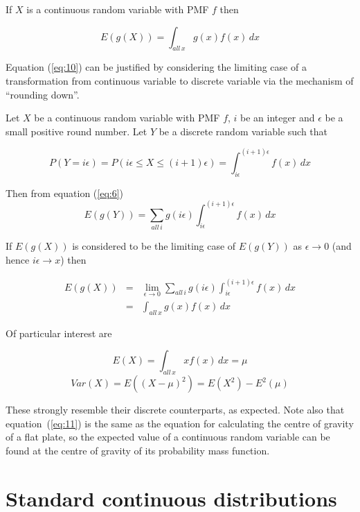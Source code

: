 \documentclass[a5paper]{article}
\begin{document}
If $X$ is a continuous random variable with PMF $f$ then

\begin{equation}\label{eq:10}
  E(g(X)) = \int_{all\,x}g(x)f(x)\,dx
\end{equation}

Equation (\ref{eq:10}) can be justified by considering the limiting case of a
transformation from continuous variable to discrete variable via the
mechanism of ``rounding down''.

Let $X$ be a continuous random variable with PMF $f$, $i$ be an integer and
$\epsilon$ be a small positive round number. Let $Y$ be a discrete random
variable such that

\begin{equation}
  P(Y\!=\!i\epsilon) = P(i\epsilon\le X\le (i+1)\epsilon) =
  \int_{i\epsilon}^{(i+1)\epsilon}f(x)\,dx
\end{equation}

Then from equation (\ref{eq:6})
\nopagebreak
\begin{equation}
  E(g(Y)) = \sum_{all\,i}g(i\epsilon)\int_{i\epsilon}^{(i+1)\epsilon}f(x)\,dx
\end{equation}

If $E(g(X))$ is considered to be the limiting case of $E(g(Y))$ as
$\epsilon\rightarrow 0$ (and hence $i\epsilon\rightarrow x$) then

\begin{eqnarray}
  E(g(X)) &=& \lim_{\epsilon\rightarrow 0}
  \sum_{all\,i}g(i\epsilon)\int_{i\epsilon}^{(i+1)\epsilon}f(x)\,dx\nonumber\\
  &=& \int_{all\,x}g(x)f(x)\,dx
\end{eqnarray}

Of particular interest are

\begin{equation}\label{eq:11}
  E(X) = \int_{all\,x}xf(x)\,dx = \mu
\end{equation}
\begin{equation}
  Var(X) = E((X-\mu)^2) = E(X^2) - E^2(\mu)
\end{equation}

These strongly resemble their discrete counterparts, as expected. Note also that
equation~(\ref{eq:11}) is the same as the equation for calculating the centre of
gravity of a flat plate, so the expected value of a continuous random variable
can be found at the centre of gravity of its probability mass function.

\section{Standard continuous distributions}
\end{document}
